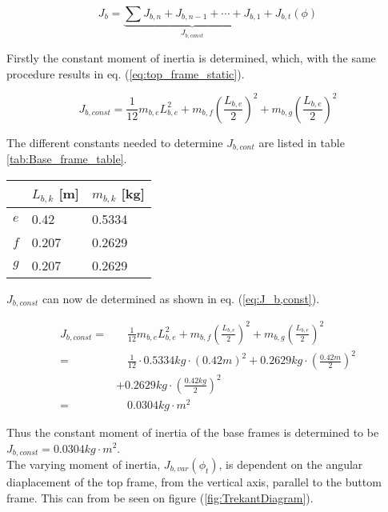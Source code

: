 \documentclass[../../main]{subfiles}
\begin{document}
\begin{equation}
  \label{eq:Base_frame_equ}
  J_b =
  \underbrace{
  \sum J_{b,n} + J_{b,n-1} + \dotsb + J_{b,1}}_\text{$J_{b,const}$} + J_{b,t}(\phi)
\end{equation}

Firstly the constant moment of inertia is determined, which, with the same procedure results in eq. (\ref{eq:top_frame_static}).

\begin{equation}
  J_{b,const} = \frac{1}{12}m_{b,e}L_{b,e}^2 + m_{b,f} \left( \frac{L_{b,e}}{2} \right)^2 + m_{b,g}\left(\frac{L_{b,e}}{2}\right)^2
\end{equation}

The different constants needed to determine $J_{b,cont}$ are listed in table \ref{tab:Base_frame_table}.

\begin{table}[H]
\centering
\begin{tabular}{|l|l|l|}
\hline
  & $L_{b,k}$ [m]  & $m_{b,k}$ [kg]  \\
\hline
$e$ & 0.42  & 0.5334  \\
\hline
$f$ & 0.207  & 0.2629  \\
\hline
$g$ & 0.207 & 0.2629  \\
\hline
\end{tabular}
    \label{tab:mass_table}
\end{table}

$J_{b,const}$ can now de determined as shown in eq. (\ref{eq:J_b,const}).

\begin{equation}
  \label{eq:J_b,const}
  \begin{split}
      J_{b,const} =& \quad \frac{1}{12}m_{b,e}L_{b,e}^2 + m_{b,f} \left( \frac{L_{b,e}}{2} \right)^2 + m_{b,g}\left(\frac{L_{b,e}}{2}\right)^2\\
      =& \quad \frac{1}{12} \cdot 0.5334\si{kg} \cdot (0.42 \si{m})^2 + 0.2629\si{kg} \cdot \left( \frac{0.42 \si{m}}{2} \right)^2 \\
      &+ 0.2629 \si{kg}\cdot \left(\frac{0.42 \si{kg}}{2}\right)^2\\
      =& \quad 0.0304 \si{kg\cdot m^2}
  \end{split}
\end{equation}

Thus the constant moment of inertia of the base frames is determined to be $J_{b,const} = 0.0304 \si{kg\cdot m^2}$.
\\
The varying moment of inertia, $J_{b,var}(\phi_t)$, is dependent on the angular diaplacement of the top frame, from the vertical axis, parallel to the buttom frame. This can from be seen on figure (\ref{fig:TrekantDiagram}).
\end{document}

